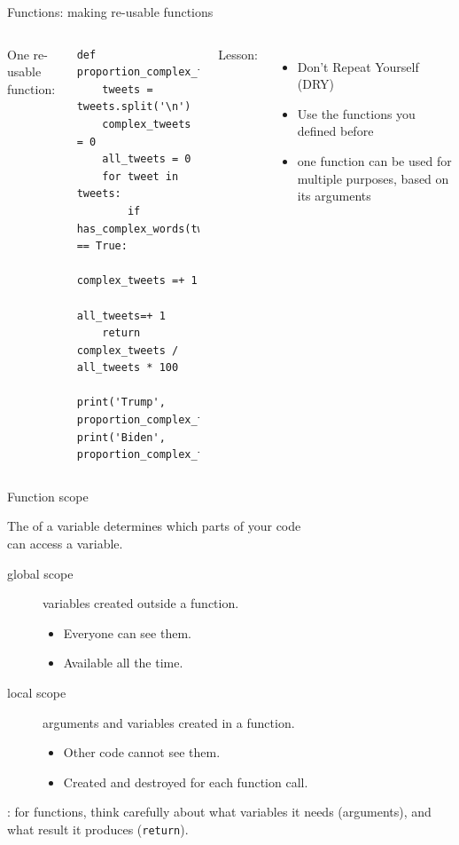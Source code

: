 \documentclass[aspectratio=169,usenames,dvipsnames]{beamer}
\begin{document}
\begin{frame}[fragile]{Functions: making re-usable functions}
\begin{columns}[T]
One re-usable function: 
\begin{lstlisting}[style=smaller]
def proportion_complex_tweets(tweets):
    tweets = tweets.split('\n')
    complex_tweets = 0
    all_tweets = 0
    for tweet in tweets: 
        if has_complex_words(tweet) == True: 
            complex_tweets =+ 1
        all_tweets=+ 1  
    return complex_tweets / all_tweets * 100

print('Trump', proportion_complex_tweets(trump))
print('Biden', proportion_complex_tweets(biden))
\end{lstlisting}

\pause{}
Lesson:
    \begin{itemize}
        \item Don't Repeat Yourself (DRY)
        \item Use the functions you defined before
        \item one function can be used for multiple purposes,
            based on its arguments
    \end{itemize}
\end{columns}
\end{frame}


\begin{frame}[fragile]{Function scope}
    \begin{definition}
        The  of a variable determines which parts of your code \\
            can access a variable.
    \end{definition}
    \begin{description}
        \item[global scope] variables created outside a function.
            \begin{itemize}
                \item Everyone can see them.
                \item Available all the time.
            \end{itemize}
        \item[local scope] arguments and variables created in a function.
            \begin{itemize}
                \item Other code cannot see them.
                \item Created and destroyed for each function call.
            \end{itemize}
    \end{description}

    \pause
    : for functions, think carefully about what variables
        it needs (arguments), and what result it produces (\lstinline{return}).
\end{frame}
\end{document}

